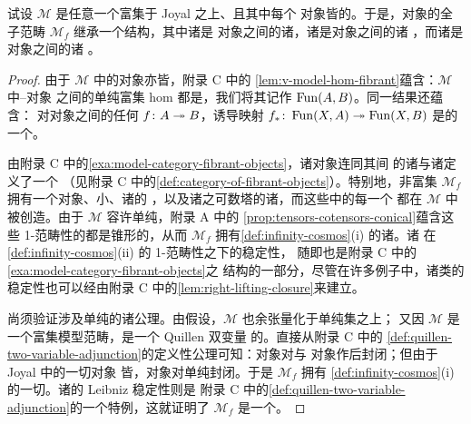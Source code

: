 \begin{proposition}\label{prop:fibrant-objects-cosmos}
试设 $\mathcal{M}$ 是任意一个富集于 Joyal \trModelStructure{}之上、且其中每个%
\trFibrant{}对象皆\trCofibrant{}的\trModelCategory。于是，\trFibrant{}对象的全子范畴
$\mathcal{M}_{f}$ 继承一个\trInfinityCosmos{}结构，其中诸\trIsofibration{}是%
\trFibrant{}对象之间的诸\trFibration，诸\trEquivalence{}是\trFibrant{}对象之间的诸%
\trWeakEquivalence，而诸\trTrivialFibration{}是\trFibrant{}对象之间的诸%
\trTrivialFibration。
\end{proposition}
\begin{proof}
由于 $\mathcal{M}$ 中的\trFibrant{}对象亦皆\trCofibrant，附录 C 中的%
\cref{lem:v-model-hom-fibrant}蕴含：$\mathcal{M}$ 中\trFibrant{}–\trCofibrant{}对象
之间的单纯富集 hom 都是\trQuasiCategory，我们将其记作 $\operatorname{Fun}(A,B)$。同一结果还蕴含：
对\trFibrant{}对象之间的任何\trFibration{} $f\colon A\twoheadrightarrow B$，诱导映射
$f_{\ast}\colon\operatorname{Fun}(X,A)\twoheadrightarrow\operatorname{Fun}(X,B)$ 是\trQuasiCategory{}的一个\trIsofibration。

由附录 C 中的\cref{exa:model-category-fibrant-objects}，诸\trFibrant{}对象连同其间
的诸\trFibration{}与诸\trWeakEquivalence{}定义了一个\trCategoryOfFibrantObjects
（见附录 C 中的\cref{def:category-of-fibrant-objects}）。特别地，非富集\trCategory
$\mathcal{M}_{f}$ 拥有一个\trTerminal{}对象、小\trProduct、诸\trIsofibration{}的%
\trPullback，以及诸\trIsofibration{}之可数塔的诸\trLimit，而这些\trLimit{}中的每一个
都在 $\mathcal{M}$ 中被创造。由于 $\mathcal{M}$ 容许单纯\trTensor，附录 A 中的%
\cref{prop:tensors-cotensors-conical}蕴含这些 1-范畴性的\trLimit{}都是锥形的，从而
$\mathcal{M}_{f}$ 拥有\cref{def:infinity-cosmos}(i) 的诸\trConicalLimit。诸%
\trIsofibration{}在\cref{def:infinity-cosmos}(ii) 的 1-范畴性\trLimit{}之下的稳定性，
随即也是附录 C 中的\cref{exa:model-category-fibrant-objects}之%
\trCategoryOfFibrantObjects{}结构的一部分，尽管在许多例子中，诸\trIsofibration{}类的
稳定性也可以经由附录 C 中的\cref{lem:right-lifting-closure}来建立。

尚须验证涉及单纯\trCotensor{}的诸公理。由假设，$\mathcal{M}$ 也余张量化于单纯集之上；
又因 $\mathcal{M}$ 是一个富集模型范畴，\trCotensor{}\trBifunctor{}是一个 Quillen 双变量%
\trAdjunction{}的\trRightAdjoint。直接从附录 C 中的%
\cref{def:quillen-two-variable-adjunction}的定义性公理可知：\trFibrant{}对象对与%
\trCofibrant{}对象作\trCotensor{}后封闭；但由于 Joyal \trModelStructure{}中的一切对象
皆\trCofibrant，\trFibrant{}对象对单纯\trCotensor{}封闭。于是 $\mathcal{M}_{f}$ 拥有
\cref{def:infinity-cosmos}(i) 的一切\trLimit。诸\trIsofibration{}的 Leibniz 稳定性则是
附录 C 中的\cref{def:quillen-two-variable-adjunction}的一个特例，这就证明了
$\mathcal{M}_{f}$ 是一个\trInfinityCosmos。


\end{proof}
